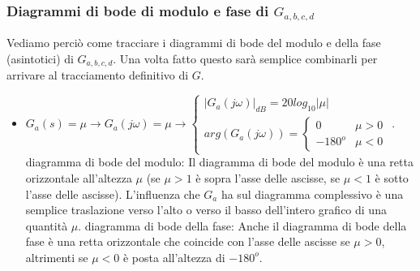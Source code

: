 \subsubsection{Diagrammi di bode di modulo e fase di $G_{a,b,c,d}$}
Vediamo perciò come tracciare i diagrammi di bode del modulo e della fase (asintotici) di $G_{a,b,c,d}$. Una volta fatto questo sarà semplice combinarli per arrivare al tracciamento definitivo di $G$.
\begin{itemize}
    \item $G_a(s) = \mu \rightarrow  G_a(j \omega) = \mu \rightarrow \begin{cases}
        |G_a(j \omega)|_{dB} = 20 log_{10}|\mu|\\
        arg(G_a(j \omega)) = \begin{cases}
            0 \;\;\; & \mu>0\\
            -180^o & \mu<0
        \end{cases}
    \end{cases}$.\newline \newline
    diagramma di bode del modulo: Il diagramma di bode del modulo è una retta orizzontale all'altezza $\mu$ (se $\mu > 1$ è sopra l'asse delle ascisse, se $\mu < 1$ è sotto l'asse delle ascisse). L'influenza che $G_a$ ha sul diagramma complessivo è una semplice traslazione verso l'alto o verso il basso dell'intero grafico di una quantità $\mu$.\newline \newline
    diagramma di bode della fase: Anche il diagramma di bode della fase è una retta orizzontale che coincide con l'asse delle ascisse se $\mu>0$, altrimenti se $\mu<0$ è posta all'altezza di $-180^o$.
\end{itemize}